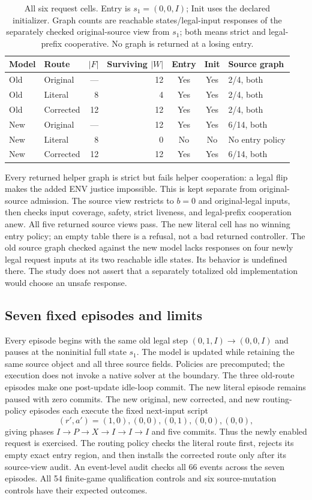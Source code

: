 \begin{table}[ht]
\centering\small
\caption{All six request cells. Entry is $s_1=(0,0,I)$; Init uses the
declared initializer. Graph counts are reachable states/legal-input
responses of the separately checked original-source view from $s_1$;
both means strict and legal-prefix cooperative.
No graph is returned at a losing entry.}
\label{tab:request-six}
\begin{tabular}{@{}llrrccl@{}}\toprule
Model & Route & $|F|$ & Surviving $|W|$ & Entry & Init & Source graph\\\midrule
Old & Original & --- & 12 & Yes & Yes & 2/4, both\\
Old & Literal & 8 & 4 & Yes & Yes & 2/4, both\\
Old & Corrected & 12 & 12 & Yes & Yes & 2/4, both\\
New & Original & --- & 12 & Yes & Yes & 6/14, both\\
New & Literal & 8 & 0 & No & No & No entry policy\\
New & Corrected & 12 & 12 & Yes & Yes & 6/14, both\\\bottomrule
\end{tabular}
\end{table}

Every returned helper graph is strict but fails helper cooperation:
a legal flip makes the added ENV justice impossible. This is kept
separate from original-source admission. The source view restricts
to $b=0$ and original-legal inputs, then checks input coverage, safety,
strict liveness, and legal-prefix cooperation anew. All five returned
source views pass. The new literal cell has no winning entry policy;
an empty table there is a refusal, not a bad returned controller.
The old source graph checked against the new model lacks responses
on four newly legal request inputs at its two reachable idle states.
Its behavior is undefined there. The study does not assert that a
separately totalized old implementation would choose an unsafe response.

\subsection{Seven fixed episodes and limits}
Every episode begins with the same old legal step
$(0,1,I)\to(0,0,I)$ and pauses at the noninitial full state $s_1$.
The model is updated while retaining the same source object and all
three source fields. Policies are precomputed; the execution does not
invoke a native solver at the boundary. The three old-route episodes
make one post-update idle-loop commit. The new literal episode remains
paused with zero commits. The new original, new corrected, and new
routing-policy episodes each execute the fixed next-input script
\[
 (r',a')=(1,0),(0,0),(0,1),(0,0),(0,0),
\]
giving phases $I\to P\to X\to I\to I\to I$ and five commits.
Thus the newly enabled request is exercised. The routing policy checks
the literal route first, rejects its empty exact entry region, and
then installs the corrected route only after its source-view audit.
An event-level audit checks all 66 events across the seven episodes.
All 54 finite-game qualification controls and six source-mutation
controls have their expected outcomes.


